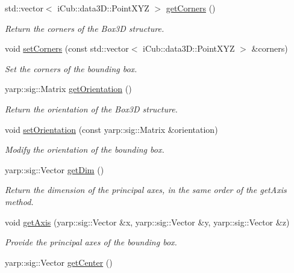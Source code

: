 \begin{DoxyCompactItemize}
std\+::vector$<$ i\+Cub\+::data3\+D\+::\+Point\+X\+YZ $>$ \hyperlink{classiCub_1_1data3D_1_1BoundingBox_a08949c30ec7ee296981c11ad5ff4714e}{get\+Corners} ()
\begin{DoxyCompactList}\small\item\em Return the corners of the Box3D structure. \end{DoxyCompactList}\item 
void \hyperlink{classiCub_1_1data3D_1_1BoundingBox_a0cf2386f7eb05f18a69ccca09c589c17}{set\+Corners} (const std\+::vector$<$ i\+Cub\+::data3\+D\+::\+Point\+X\+YZ $>$ \&corners)
\begin{DoxyCompactList}\small\item\em Set the corners of the bounding box. \end{DoxyCompactList}\item 
yarp\+::sig\+::\+Matrix \hyperlink{classiCub_1_1data3D_1_1BoundingBox_a2f5c9ef6a7d295e0ae60d1bf51c236b6}{get\+Orientation} ()
\begin{DoxyCompactList}\small\item\em Return the orientation of the Box3D structure. \end{DoxyCompactList}\item 
void \hyperlink{classiCub_1_1data3D_1_1BoundingBox_a9d2cc0a0613750a48567f118d3b3a0eb}{set\+Orientation} (const yarp\+::sig\+::\+Matrix \&orientation)
\begin{DoxyCompactList}\small\item\em Modify the orientation of the bounding box. \end{DoxyCompactList}\item 
yarp\+::sig\+::\+Vector \hyperlink{classiCub_1_1data3D_1_1BoundingBox_a96d06a9d784ac627078353814207ad68}{get\+Dim} ()
\begin{DoxyCompactList}\small\item\em Return the dimension of the principal axes, in the same order of the get\+Axis method. \end{DoxyCompactList}\item 
void \hyperlink{classiCub_1_1data3D_1_1BoundingBox_a768e10207aef845d49e9788809b5f69f}{get\+Axis} (yarp\+::sig\+::\+Vector \&x, yarp\+::sig\+::\+Vector \&y, yarp\+::sig\+::\+Vector \&z)
\begin{DoxyCompactList}\small\item\em Provide the principal axes of the bounding box. \end{DoxyCompactList}\item 
yarp\+::sig\+::\+Vector \hyperlink{classiCub_1_1data3D_1_1BoundingBox_af16a8f9810623cfa43b0efcee20ebc44}{get\+Center} ()

\end{DoxyCompactItemize}
